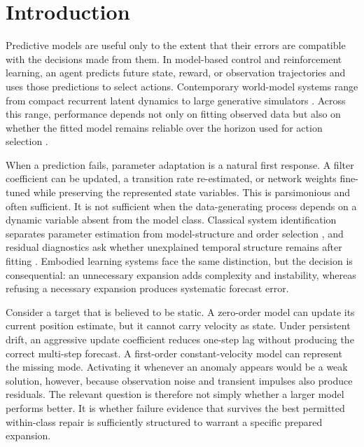 \documentclass[10pt]{article}
\begin{document}
\section{Introduction}

Predictive models are useful only to the extent that their errors are compatible with the decisions made from them. In model-based control and reinforcement learning, an agent predicts future state, reward, or observation trajectories and uses those predictions to select actions. Contemporary world-model systems range from compact recurrent latent dynamics to large generative simulators \cite{ha2018world,hafner2019planet,hafner2025dreamerv3,hou2026survey}. Across this range, performance depends not only on fitting observed data but also on whether the fitted model remains reliable over the horizon used for action selection \cite{hafner2019planet,janner2019mbpo}.

When a prediction fails, parameter adaptation is a natural first response. A filter coefficient can be updated, a transition rate re-estimated, or network weights fine-tuned while preserving the represented state variables. This is parsimonious and often sufficient. It is not sufficient when the data-generating process depends on a dynamic variable absent from the model class. Classical system identification separates parameter estimation from model-structure and order selection \cite{ljung1999system,akaike1974identification}, and residual diagnostics ask whether unexplained temporal structure remains after fitting \cite{ljung1978lack}. Embodied learning systems face the same distinction, but the decision is consequential: an unnecessary expansion adds complexity and instability, whereas refusing a necessary expansion produces systematic forecast error.

Consider a target that is believed to be static. A zero-order model can update its current position estimate, but it cannot carry velocity as state. Under persistent drift, an aggressive update coefficient reduces one-step lag without producing the correct multi-step forecast. A first-order constant-velocity model can represent the missing mode. Activating it whenever an anomaly appears would be a weak solution, however, because observation noise and transient impulses also produce residuals. The relevant question is therefore not simply whether a larger model performs better. It is whether failure evidence that survives the best permitted within-class repair is sufficiently structured to warrant a specific prepared expansion.
\end{document}

